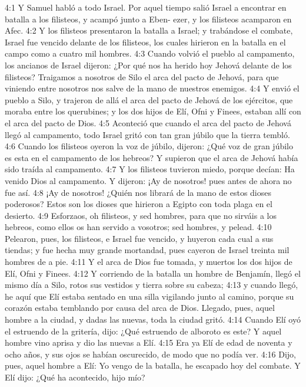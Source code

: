4:1 Y Samuel habló a todo Israel. Por aquel tiempo salió Israel a encontrar en batalla a los filisteos, y acampó junto a Eben- ezer, y los filisteos acamparon en Afec.  
4:2 Y los filisteos presentaron la batalla a Israel; y trabándose el combate, Israel fue vencido delante de los filisteos, los cuales hirieron en la batalla en el campo como a cuatro mil hombres.  
4:3 Cuando volvió el pueblo al campamento, los ancianos de Israel dijeron: ¿Por qué nos ha herido hoy Jehová delante de los filisteos? Traigamos a nosotros de Silo el arca del pacto de Jehová, para que viniendo entre nosotros nos salve de la mano de nuestros enemigos.  
4:4 Y envió el pueblo a Silo, y trajeron de allá el arca del pacto de Jehová de los ejércitos, que moraba entre los querubines; y los dos hijos de Elí, Ofni y Finees, estaban allí con el arca del pacto de Dios. 
4:5 Aconteció que cuando el arca del pacto de Jehová llegó al campamento, todo Israel gritó con tan gran júbilo que la tierra tembló.  
4:6 Cuando los filisteos oyeron la voz de júbilo, dijeron: ¿Qué voz de gran júbilo es esta en el campamento de los hebreos? Y supieron que el arca de Jehová había sido traída al campamento.  
4:7 Y los filisteos tuvieron miedo, porque decían: Ha venido Dios al campamento. Y dijeron: ¡Ay de nosotros! pues antes de ahora no fue así.  
4:8 ¡Ay de nosotros! ¿Quién nos librará de la mano de estos dioses poderosos? Estos son los dioses que hirieron a Egipto con toda plaga en el desierto.  
4:9 Esforzaos, oh filisteos, y sed hombres, para que no sirváis a los hebreos, como ellos os han servido a vosotros; sed hombres, y pelead.  
4:10 Pelearon, pues, los filisteos, e Israel fue vencido, y huyeron cada cual a sus tiendas; y fue hecha muy grande mortandad, pues cayeron de Israel treinta mil hombres de a pie.  
4:11 Y el arca de Dios fue tomada, y muertos los dos hijos de Elí, Ofni y Finees.  
4:12 Y corriendo de la batalla un hombre de Benjamín, llegó el mismo día a Silo, rotos sus vestidos y tierra sobre su cabeza;  
4:13 y cuando llegó, he aquí que Elí estaba sentado en una silla vigilando junto al camino, porque su corazón estaba temblando por causa del arca de Dios. Llegado, pues, aquel hombre a la ciudad, y dadas las nuevas, toda la ciudad gritó.  
4:14 Cuando Elí oyó el estruendo de la gritería, dijo: ¿Qué estruendo de alboroto es este? Y aquel hombre vino aprisa y dio las nuevas a Elí.  
4:15 Era ya Elí de edad de noventa y ocho años, y sus ojos se habían oscurecido, de modo que no podía ver.  
4:16 Dijo, pues, aquel hombre a Elí: Yo vengo de la batalla, he escapado hoy del combate. Y Elí dijo: ¿Qué ha acontecido, hijo mío?  
